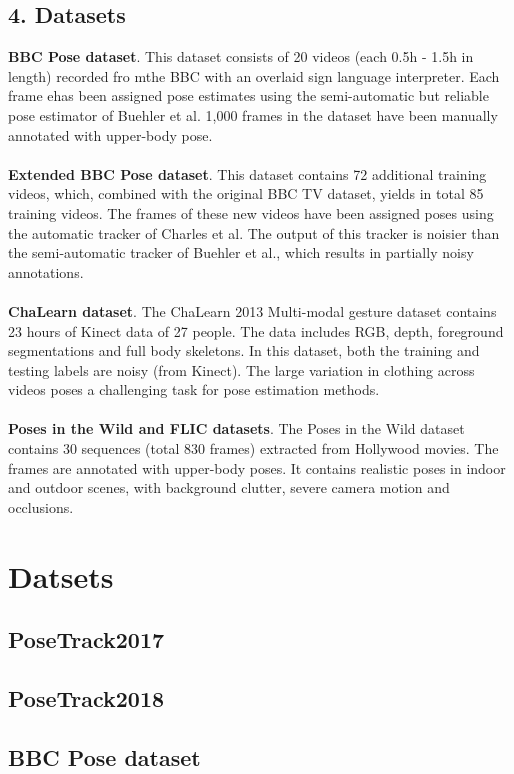 \documentclass[a4paper]{report}
\begin{document}
\section*{4. Datasets}
\textbf{BBC Pose dataset}. This dataset consists of 20 videos (each 0.5h - 1.5h in length) recorded fro mthe BBC with an overlaid sign language interpreter. Each frame ehas been assigned pose estimates using the semi-automatic but reliable pose estimator of Buehler et al. 1,000 frames in the dataset have been manually annotated with upper-body pose.
\\
\\
\textbf{Extended BBC Pose dataset}. This dataset contains 72 additional training videos, which, combined with the original BBC TV dataset, yields in total 85 training videos. The frames of these new videos have been assigned poses using the automatic tracker of Charles et al. The output of this tracker is noisier than the semi-automatic tracker of Buehler et al., which results in partially noisy annotations.
\\
\\
\textbf{ChaLearn dataset}. The ChaLearn 2013 Multi-modal gesture dataset contains 23 hours of Kinect data of 27 people. The data includes RGB, depth, foreground segmentations and full body skeletons. In this dataset, both the training and testing labels are noisy (from Kinect). The large variation in clothing across videos poses a challenging task for pose estimation methods.
\\
\\
\textbf{Poses in the Wild and FLIC datasets}. The Poses in the Wild dataset contains 30 sequences (total 830 frames) extracted from Hollywood movies. The frames are annotated with upper-body poses. It contains realistic poses in indoor and outdoor scenes, with background clutter, severe camera motion and occlusions.

\chapter*{Datsets}
\section*{PoseTrack2017}
\section*{PoseTrack2018}
\section*{BBC Pose dataset}
\end{document}
